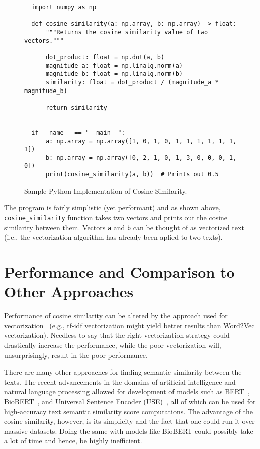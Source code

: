 \documentclass[11pt]{article}
\begin{document}
\begin{figure}[H]
  \begin{verbatim}
  import numpy as np

  def cosine_similarity(a: np.array, b: np.array) -> float:
      """Returns the cosine similarity value of two vectors."""

      dot_product: float = np.dot(a, b)
      magnitude_a: float = np.linalg.norm(a)
      magnitude_b: float = np.linalg.norm(b)
      similarity: float = dot_product / (magnitude_a * magnitude_b)

      return similarity


  if __name__ == "__main__":
      a: np.array = np.array([1, 0, 1, 0, 1, 1, 1, 1, 1, 1, 1])
      b: np.array = np.array([0, 2, 1, 0, 1, 3, 0, 0, 0, 1, 0])
      print(cosine_similarity(a, b))  # Prints out 0.5
  \end{verbatim}
  \caption{Sample Python Implementation of Cosine Similarity.}
\end{figure}

The program is fairly simplistic (yet performant) and as shown above,
\texttt{cosine_similarity} function takes two vectors and prints
out the cosine similarity between them. Vectors \texttt{a} and
\texttt{b} can be thought of as vectorized text (i.e., the
vectorization algorithm has already been aplied to two texts).


\section{Performance and Comparison to Other Approaches}

Performance of cosine similarity can be altered by the approach used for
vectorization~\cite{sitikhu2019} (e.g., tf-idf vectorization might yield better
results than Word2Vec vectorization). Needless to say that the right
vectorization strategy could drastically increase the performance, while the
poor vectorization will, unsurprisingly, result in the poor performance.

\medskip

There are many other approaches for finding semantic similarity between the
texts. The recent advancements in the domains of artificial intelligence and
natural language processing allowed for development of models such as
BERT~\cite{turc2019}, BioBERT~\cite{btz682}, and Universal Sentence Encoder
(USE)~\cite{use}, all of which can be used for high-accuracy text semantic
similarity score computations. The advantage of the cosine similarity, however,
is its simplicity and the fact that one could run it over massive datasets.
Doing the same with models like BioBERT could possibly take a lot of time and
hence, be highly inefficient.
\end{document}
